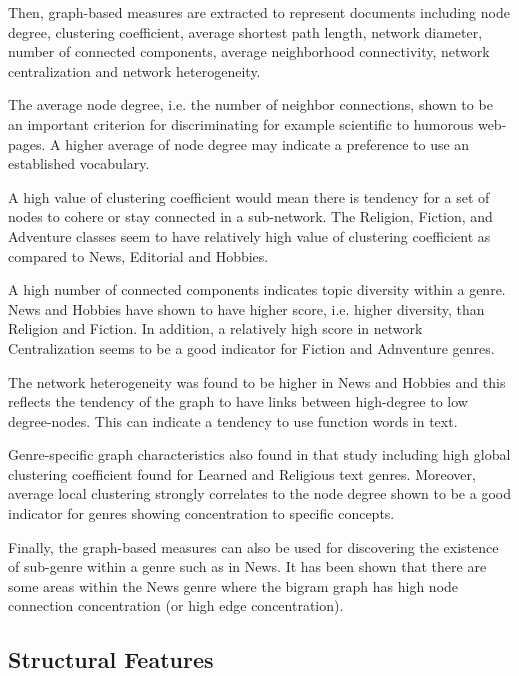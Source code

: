 Then, graph-based measures are extracted to represent documents including node degree, clustering coefficient, average shortest path length, network diameter, number of connected components, average neighborhood connectivity, network centralization and network heterogeneity.  

The average node degree, i.e. the number of neighbor connections, shown  to be an important criterion for discriminating for example scientific to humorous web-pages. A higher average of node degree may indicate a preference to use an established vocabulary.

A high value of clustering coefficient would mean there is tendency for a set of nodes to cohere or stay connected in a sub-network. The Religion, Fiction, and Adventure classes seem to have relatively high value of clustering coefficient as compared to News, Editorial and Hobbies. 

A high number of connected components indicates topic diversity within a genre. News and Hobbies have shown to have higher score, i.e. higher diversity, than Religion and Fiction. In addition, a relatively high score in network Centralization seems to be a good indicator for Fiction and Adnventure genres.

The network heterogeneity was found to be higher in News and Hobbies and this reflects the tendency of the graph to have links between high-degree to low degree-nodes. This can indicate a tendency to use function words in text.

Genre-specific graph characteristics also found in that study \parencite{nabhan2016graph} including high global clustering coefficient found for Learned and Religious text genres. Moreover, average local clustering strongly correlates to the node degree shown to be a good indicator for genres showing concentration to specific concepts.

Finally, the graph-based measures can also be used for discovering the existence of sub-genre within a genre such as in News. It has been shown that there are some areas within the News genre where the bigram graph has high node connection concentration (or high edge concentration).  

\subsection{Structural Features}

